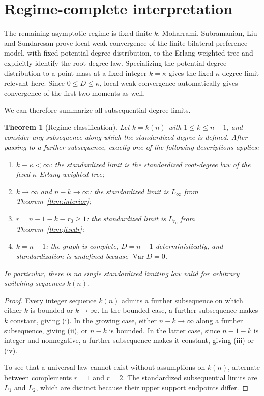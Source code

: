 \documentclass[11pt]{article}
\newtheorem{theorem}{Theorem}[section]
\theoremstyle{remark}
\newcommand{\Var}{\operatorname{Var}}
\newcommand{\1}{\mathbf 1}
\begin{document}
\section{Regime-complete interpretation}

The remaining asymptotic regime is fixed finite $k$. Moharrami, Subramanian, Liu and Sundaresan prove local weak convergence of the finite bilateral-preference model, with fixed potential degree distribution, to the Erlang weighted tree and explicitly identify the root-degree law. Specializing the potential degree distribution to a point mass at a fixed integer $k=\kappa$ gives the fixed-$\kappa$ degree limit relevant here. Since $0\le D\le\kappa$, local weak convergence automatically gives convergence of the first two moments as well.

We can therefore summarize all subsequential degree limits.

\begin{theorem}[Regime classification]\label{thm:classification}
Let $k=k(n)$ with $1\le k\le n-1$, and consider any subsequence along which the standardized degree is defined. After passing to a further subsequence, exactly one of the following descriptions applies:
\begin{enumerate}[label=(\roman*)]
\item $k\equiv\kappa<\infty$: the standardized limit is the standardized root-degree law of the fixed-$\kappa$ Erlang weighted tree;
\item $k\to\infty$ and $n-k\to\infty$: the standardized limit is $L_\infty$ from Theorem~\ref{thm:interior};
\item $r=n-1-k\equiv r_0\ge1$: the standardized limit is $L_{r_0}$ from Theorem~\ref{thm:fixedr};
\item $k=n-1$: the graph is complete, $D=n-1$ deterministically, and standardization is undefined because $\Var D=0$.
\end{enumerate}
In particular, there is no single standardized limiting law valid for arbitrary switching sequences $k(n)$.
\end{theorem}

\begin{proof}
Every integer sequence $k(n)$ admits a further subsequence on which either $k$ is bounded or $k\to\infty$. In the bounded case, a further subsequence makes $k$ constant, giving (i). In the growing case, either $n-k\to\infty$ along a further subsequence, giving (ii), or $n-k$ is bounded. In the latter case, since $n-1-k$ is integer and nonnegative, a further subsequence makes it constant, giving (iii) or (iv).

To see that a universal law cannot exist without assumptions on $k(n)$, alternate between complements $r=1$ and $r=2$. The standardized subsequential limits are $L_1$ and $L_2$, which are distinct because their upper support endpoints differ.
\end{proof}
\end{document}
